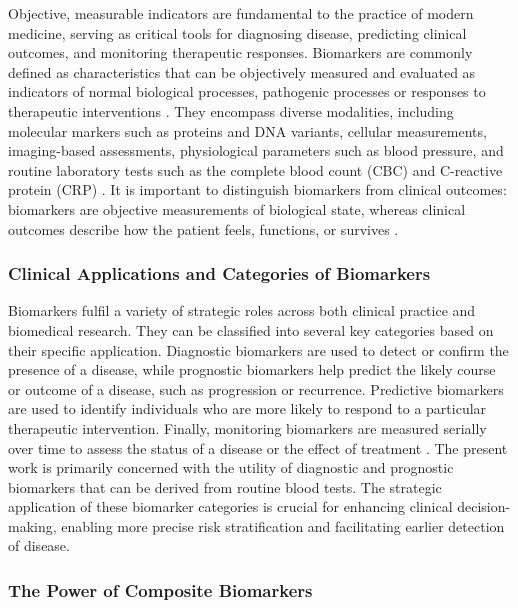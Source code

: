 \documentclass[12pt,a4paper]{article}
\begin{document}
Objective, measurable indicators are fundamental to the practice of modern medicine, serving as critical tools for diagnosing disease, predicting clinical outcomes, and monitoring therapeutic responses. Biomarkers are commonly defined as characteristics that can be objectively measured and evaluated as indicators of normal biological processes, pathogenic processes or responses to therapeutic interventions \cite{ref1,ref2,ref20}. They encompass diverse modalities, including molecular markers such as proteins and DNA variants, cellular measurements, imaging-based assessments, physiological parameters such as blood pressure, and routine laboratory tests such as the complete blood count (CBC) and C-reactive protein (CRP) \cite{ref1,ref3}. It is important to distinguish biomarkers from clinical outcomes: biomarkers are objective measurements of biological state, whereas clinical outcomes describe how the patient feels, functions, or survives \cite{ref2}.

\subsubsection{Clinical Applications and Categories of Biomarkers}

Biomarkers fulfil a variety of strategic roles across both clinical practice and biomedical research. They can be classified into several key categories based on their specific application. Diagnostic biomarkers are used to detect or confirm the presence of a disease, while prognostic biomarkers help predict the likely course or outcome of a disease, such as progression or recurrence. Predictive biomarkers are used to identify individuals who are more likely to respond to a particular therapeutic intervention. Finally, monitoring biomarkers are measured serially over time to assess the status of a disease or the effect of treatment \cite{ref2,ref3}. The present work is primarily concerned with the utility of diagnostic and prognostic biomarkers that can be derived from routine blood tests. The strategic application of these biomarker categories is crucial for enhancing clinical decision-making, enabling more precise risk stratification and facilitating earlier detection of disease.

\subsubsection{The Power of Composite Biomarkers}
\end{document}
